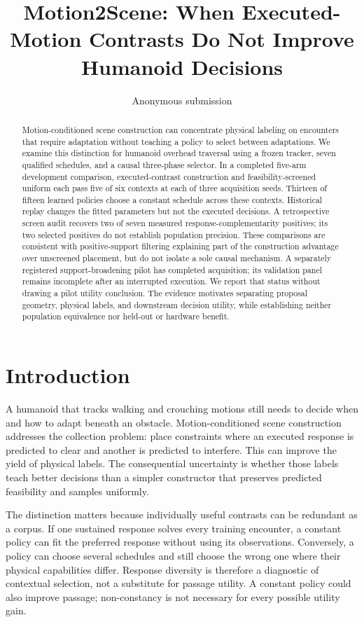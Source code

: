 \documentclass[letterpaper,10pt,conference]{ieeeconf}
\title{Motion2Scene: When Executed-Motion Contrasts Do Not Improve Humanoid Decisions}
\author{Anonymous submission}
\begin{document}
\maketitle
\thispagestyle{empty}\pagestyle{empty}
\begin{abstract}
Motion-conditioned scene construction can concentrate physical labeling on
encounters that require adaptation without teaching a policy to select between
adaptations. We examine this distinction for humanoid overhead traversal using
a frozen tracker, seven qualified schedules, and a causal three-phase selector.
In a completed five-arm development comparison, executed-contrast construction
and feasibility-screened uniform each pass five of six contexts at each of
three acquisition seeds. Thirteen of fifteen learned policies choose a constant
schedule across these contexts. Historical replay changes the fitted parameters
but not the executed decisions. A retrospective screen audit recovers two of
seven measured response-complementarity positives; its two selected positives
do not establish population precision. These comparisons are consistent with
positive-support filtering explaining part of the construction advantage over
unscreened placement, but do not isolate a sole causal mechanism. A separately
registered support-broadening pilot has completed acquisition; its validation
panel remains incomplete after an interrupted execution. We report that status
without drawing a pilot utility conclusion. The evidence motivates separating
proposal geometry, physical labels, and downstream decision utility, while
establishing neither population equivalence nor held-out or hardware benefit.
\end{abstract}

\section{Introduction}
A humanoid that tracks walking and crouching motions still needs to decide when
and how to adapt beneath an obstacle. Motion-conditioned scene construction
addresses the collection problem: place constraints where an executed response
is predicted to clear and another is predicted to interfere. This can improve
the yield of physical labels. The consequential uncertainty is whether those
labels teach better decisions than a simpler constructor that preserves
predicted feasibility and samples uniformly.

The distinction matters because individually useful contrasts can be redundant
as a corpus. If one sustained response solves every training encounter, a
constant policy can fit the preferred response without using its observations.
Conversely, a policy can choose several schedules and still choose the wrong
one where their physical capabilities differ. Response diversity is therefore
a diagnostic of contextual selection, not a substitute for passage utility.
A constant policy could also improve passage; non-constancy is not necessary
for every possible utility gain.
\end{document}
